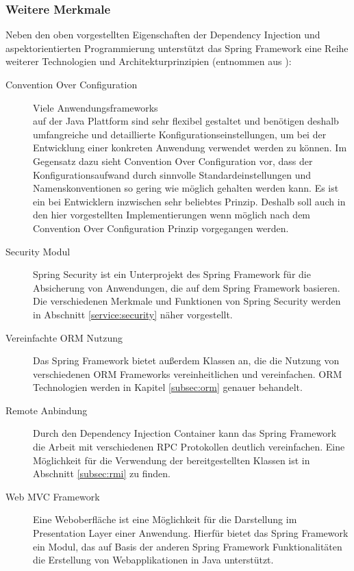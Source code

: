 \subsubsection{Weitere Merkmale}
Neben den oben vorgestellten Eigenschaften der Dependency Injection
und aspektorientierten Programmierung unterstützt das Spring Framework eine
Reihe weiterer Technologien und Architekturprinzipien
(entnommen aus \cite{spring:reference}):

\begin{description}
\item[Convention Over Configuration] Viele Anwendungsframeworks \\ auf der Java
Plattform sind sehr flexibel gestaltet und benötigen deshalb umfangreiche und
detaillierte Konfigurationseinstellungen, um bei der Entwicklung einer konkreten
Anwendung verwendet werden zu können. Im Gegensatz dazu sieht Convention Over
Configuration vor, dass der Konfigurationsaufwand durch sinnvolle
Standardeinstellungen und Namenskonventionen so gering wie möglich gehalten
werden kann. Es ist ein bei Entwicklern inzwischen sehr beliebtes Prinzip.
Deshalb soll auch in den hier vorgestellten Implementierungen wenn möglich nach
dem Convention Over Configuration Prinzip vorgegangen werden.
\item[Security Modul] Spring Security ist ein Unterprojekt
des Spring Framework für die Absicherung von Anwendungen, die auf dem Spring
Framework basieren. Die verschiedenen Merkmale und Funktionen von Spring
Security werden in Abschnitt \ref{service:security} näher vorgestellt.
\item[Vereinfachte ORM Nutzung] Das Spring Framework bietet außerdem Klassen an,
die die Nutzung von verschiedenen \ac{ORM} Frameworks vereinheitlichen und
vereinfachen. \ac{ORM} Technologien werden in Kapitel \ref{subsec:orm} genauer
behandelt.
\item[Remote Anbindung] Durch den Dependency Injection Container kann das Spring
Framework die Arbeit mit verschiedenen \ac{RPC} Protokollen
deutlich vereinfachen. Eine Möglichkeit für die Verwendung der bereitgestellten
Klassen ist in Abschnitt \ref{subsec:rmi} zu finden.
\item[Web MVC Framework] Eine Weboberfläche ist eine Möglichkeit für die
Darstellung im Presentation Layer einer Anwendung. Hierfür bietet das Spring
Framework ein Modul, das auf Basis der anderen Spring Framework
Funktionalitäten die Erstellung von Webapplikationen in Java unterstützt.
\end{description}

